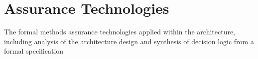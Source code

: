 \section{Assurance Technologies}

The formal methods assurance technologies applied within the architecture, 
including analysis of the architecture design and synthesis of decision logic from a formal specification

